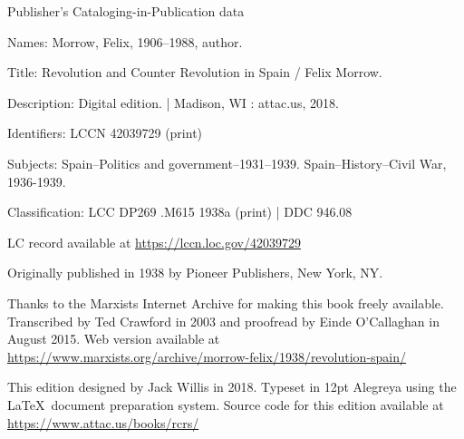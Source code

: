 {
	\setlength{\parindent}{0em}
	\setlength{\parskip}{0.5em}
	\sloppy
	
	\vspace*{\fill}
	
	Publisher’s Cataloging-in-Publication data
	
	\vspace{0.5em}
	
	{\setlength{\parskip}{0em}
		Names: Morrow, Felix, 1906--1988, author.
		
		Title: Revolution and Counter Revolution in Spain / Felix Morrow.
		
		Description: Digital edition. | Madison, WI : 
		attac.us, 2018.
		
		Identifiers: LCCN 42039729 (print)
		
		\hangindent=0.7cm
		Subjects: Spain--Politics and government--1931--1939. Spain--History--Civil War, 1936-1939.
		
		Classification: LCC DP269 .M615 1938a (print) | DDC 946.08
		
		LC record available at \url{https://lccn.loc.gov/42039729}
	}
	
	\vspace*{\fill}
	
	Originally published in 1938 by Pioneer Publishers, New York, NY.
	
	Thanks to the Marxists Internet Archive
	for making this book freely available.
	Transcribed by Ted Crawford in 2003
	and proofread by Einde O’Callaghan in August 2015.
	Web version available at
	\url{https://www.marxists.org/archive/morrow-felix/1938/revolution-spain/}
	
	This edition designed by Jack Willis in 2018.
	Typeset in 12pt Alegreya using the \LaTeX\ document preparation system.
	Source code for this edition available at \url{https://www.attac.us/books/rcrs/}
}

\newpage
\thispagestyle{empty}
\ \\

\newpage
\thispagestyle{empty}
\ \\